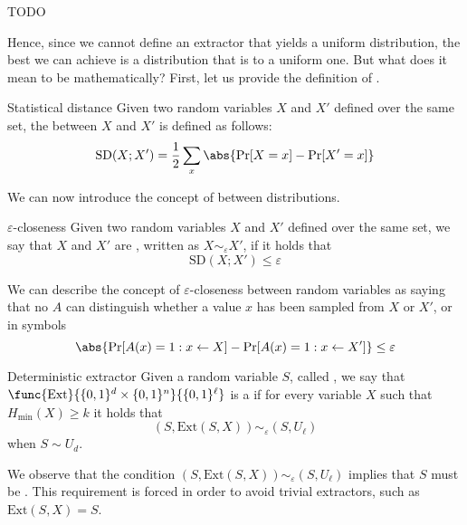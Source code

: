 \documentclass[a4paper, 12pt]{report}
\begin{document}

TODO 

Hence, since we cannot define an extractor that yields a uniform distribution, the best we can achieve is a distribution that is  to a uniform one. But what does it mean to be  mathematically? First, let us provide the definition of .

\begin{frameddefn}{Statistical distance}
	Given two random variables $X$ and $X'$ defined over the same set, the  between $X$ and $X'$ is defined as follows: $$\mbox{SD}(X; X') = \dfrac{1}{2} \sum_x{\abs{\Pr[X = x] - \Pr[X' = x]}}$$
\end{frameddefn}

We can now introduce the concept of  between distributions.

\begin{frameddefn}{$\varepsilon$-closeness}
	Given two random variables $X$ and $X'$ defined over the same set, we say that $X$ and $X'$ are , written as $X \sim_\varepsilon X'$, if it holds that $$\mbox{SD}(X; X') \le \varepsilon$$
\end{frameddefn}

We can describe the concept of $\varepsilon$-closeness between random variables as saying that no  $A$ can distinguish whether a value $x$ has been sampled from $X$ or $X'$, or in symbols $$\abs{\Pr[A(x) = 1 : x \leftarrow X] - \Pr[A(x) = 1: x \leftarrow X']} \le \varepsilon$$

\begin{frameddefn}{Deterministic extractor}
	Given a random variable $S$, called , we say that $\func{\mbox{Ext}}{\{0, 1\}^d \times \{0, 1\}^n}{\{0, 1\}^\ell}$ is a  if for every variable $X$ such that $H_\mathrm{min}(X) \ge k$ it holds that $$(S, \mathrm{Ext}(S, X)) \sim_\varepsilon (S, U_\ell)$$ when $S \sim U_d$.
\end{frameddefn}

We observe that the condition $(S, \mathrm{Ext}(S, X)) \sim_\varepsilon (S, U_\ell)$ implies that $S$ must be  . This requirement is forced in order to avoid trivial extractors, such as $\mbox{Ext}(S, X) = S$. 
\end{document}
